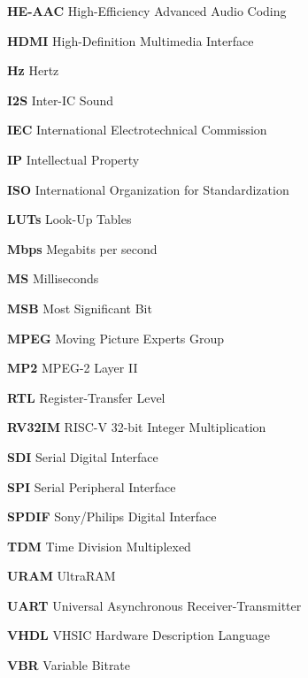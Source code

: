 \begin{description}
    \item \hspace{2mm} \textbf{HE-AAC} High-Efficiency Advanced Audio Coding
    \item \hspace{2mm} \textbf{HDMI} High-Definition Multimedia Interface
    \item \hspace{2mm} \textbf{Hz} Hertz
    \item \hspace{2mm} \textbf{I2S} Inter-IC Sound
    \item \hspace{2mm} \textbf{IEC} International Electrotechnical Commission
    \item \hspace{2mm} \textbf{IP} Intellectual Property
    \item \hspace{2mm} \textbf{ISO} International Organization for Standardization
    \item \hspace{2mm} \textbf{LUTs} Look-Up Tables
    \item \hspace{2mm} \textbf{Mbps} Megabits per second
    \item \hspace{2mm} \textbf{MS} Milliseconds
    \item \hspace{2mm} \textbf{MSB} Most Significant Bit
    \item \hspace{2mm} \textbf{MPEG} Moving Picture Experts Group
    \item \hspace{2mm} \textbf{MP2} MPEG-2 Layer II
    \item \hspace{2mm} \textbf{RTL} Register-Transfer Level
    \item \hspace{2mm} \textbf{RV32IM} RISC-V 32-bit Integer Multiplication
    \item \hspace{2mm} \textbf{SDI} Serial Digital Interface
    \item \hspace{2mm} \textbf{SPI} Serial Peripheral Interface
    \item \hspace{2mm} \textbf{SPDIF} Sony/Philips Digital Interface
    \item \hspace{2mm} \textbf{TDM} Time Division Multiplexed
    \item \hspace{2mm} \textbf{URAM} UltraRAM
    \item \hspace{2mm} \textbf{UART} Universal Asynchronous Receiver-Transmitter
    \item \hspace{2mm} \textbf{VHDL} VHSIC Hardware Description Language
    \item \hspace{2mm} \textbf{VBR} Variable Bitrate
\end{description}